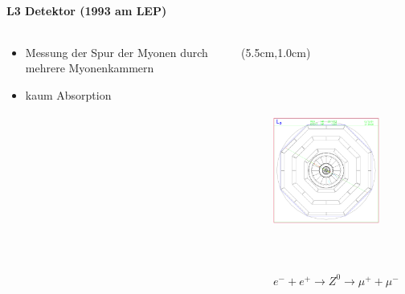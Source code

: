 \begin{iframe}
	\framesubtitle{L3 Detektor (1993 am LEP)}

\begin{columns}
		\begin{column}{0.40\textwidth}

			\begin{itemize}
				\item Messung der Spur der Myonen durch mehrere Myonenkammern
				\item kaum Absorption
			\end{itemize}
		\end{column}
		\begin{column}{0.58\textwidth}

	\begin{textblock*}{7cm}(5.5cm,1.0cm) %
	\begin{figure}
		\includegraphics[height=6.50cm]{img/muon}
		\caption*{$e^- +e^+ \rightarrow Z^0 \rightarrow \mu^+ + \mu^-$ \cite{huz0}}
	\end{figure}
\end{textblock*}
			\end{column}
\end{columns}
\end{iframe}

